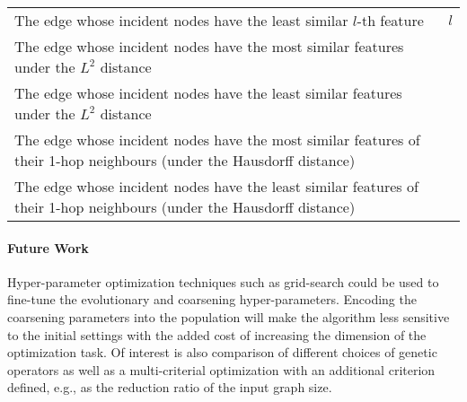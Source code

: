 \begin{table}
\begin{tabularx}{\linewidth}{Xr}
        The edge whose incident nodes have the least similar \( l \)-th feature                                                   & \( l \)                \\
        The edge whose incident nodes have the most similar features under the \( L^2 \) distance                                 &                        \\
        The edge whose incident nodes have the least similar features under the \( L^2 \) distance                             &                        \\
        The edge whose incident nodes have the most similar features of their 1-hop neighbours (under the Hausdorff distance)     &                        \\
        The edge whose incident nodes have the least similar features of their 1-hop neighbours (under the Hausdorff distance) &                        \\
        \bottomrule
    \end{tabularx}
\end{table}

\paragraph{Future Work} Hyper-parameter optimization techniques such as grid-search could be used to fine-tune the evolutionary and coarsening hyper-parameters. Encoding the coarsening parameters into the population will make the algorithm less sensitive to the initial settings with the added cost of increasing the dimension of the optimization task. Of interest is also comparison of different choices of genetic operators as well as a multi-criterial optimization with an additional criterion defined, e.g., as the reduction ratio of the input graph size.
